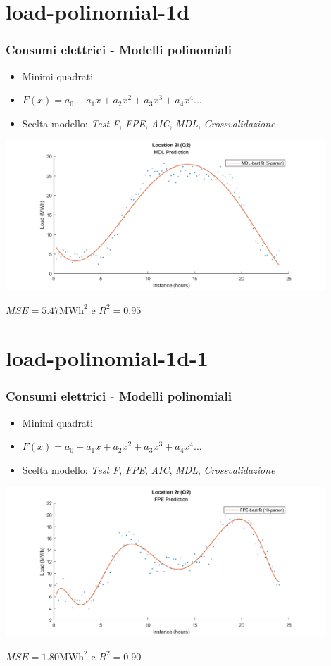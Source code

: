 \documentclass{beamer}
\begin{document}
\section{load-polinomial-1d}
\begin{frame}
    \frametitle{Consumi elettrici - Modelli polinomiali}
    \vfill    
    \begin{itemize}
        \item Minimi quadrati
        \item $F(x)=a_0+a_1x+a_2x^2+a_3x^3+a_4x^4...$        
        \item Scelta modello: 
            \textit{Test F}, 
            \textit{FPE}, 
            \textit{AIC}, 
            \textit{MDL}, 
            \textit{Crossvalidazione}
    \end{itemize}
    \vfill
    \centering
    \includegraphics[width=0.9\textwidth,keepaspectratio]{2_i_q2_MDL_poli.png}     

    \scriptsize $MSE=5.47\text{MWh}^2$ e $R^2=0.95$
\end{frame}

\section{load-polinomial-1d-1}
\begin{frame}
    \frametitle{Consumi elettrici - Modelli polinomiali}
    \vfill    
    \begin{itemize}
        \item Minimi quadrati
        \item $F(x)=a_0+a_1x+a_2x^2+a_3x^3+a_4x^4...$        
        \item Scelta modello: 
            \textit{Test F}, 
            \textit{FPE}, 
            \textit{AIC}, 
            \textit{MDL}, 
            \textit{Crossvalidazione}
    \end{itemize}
    \vfill
    \centering
    \includegraphics[width=0.9\textwidth,keepaspectratio]{2_r_q2_FPE_poli.png} 
    
    \scriptsize $MSE=1.80\text{MWh}^2$ e $R^2=0.90$
\end{frame}
\end{document}
